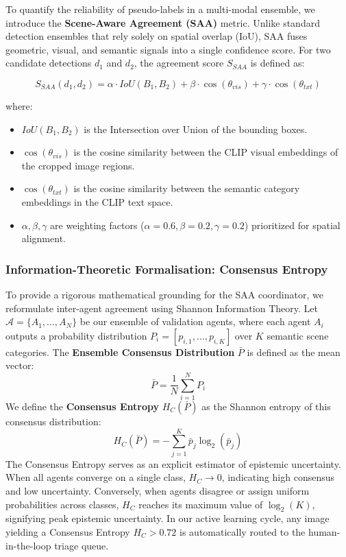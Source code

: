\documentclass[12pt,onecolumn,a4paper]{IEEEtran}
\begin{document}
To quantify the reliability of pseudo-labels in a multi-modal ensemble, we introduce the \textbf{Scene-Aware Agreement (SAA)} metric. Unlike standard detection ensembles that rely solely on spatial overlap (IoU), SAA fuses geometric, visual, and semantic signals into a single confidence score. For two candidate detections $d_1$ and $d_2$, the agreement score $S_{SAA}$ is defined as:

\begin{equation}
S_{SAA}(d_1, d_2) = \alpha \cdot IoU(B_1, B_2) + \beta \cdot \cos(\theta_{vis}) + \gamma \cdot \cos(\theta_{txt})
\end{equation}

where:
\begin{itemize}
    \item $IoU(B_1, B_2)$ is the Intersection over Union of the bounding boxes.
    \item $\cos(\theta_{vis})$ is the cosine similarity between the CLIP \cite{clip2021} visual embeddings of the cropped image regions.
    \item $\cos(\theta_{txt})$ is the cosine similarity between the semantic category embeddings in the CLIP text space.
    \item $\alpha, \beta, \gamma$ are weighting factors ($\alpha=0.6, \beta=0.2, \gamma=0.2$) prioritized for spatial alignment.
\end{itemize}

\subsubsection{Information-Theoretic Formalisation: Consensus Entropy}
To provide a rigorous mathematical grounding for the SAA coordinator, we reformulate inter-agent agreement using Shannon Information Theory. Let $\mathcal{A} = \{A_1, \dots, A_N\}$ be our ensemble of validation agents, where each agent $A_i$ outputs a probability distribution $P_i = [p_{i,1}, \dots, p_{i,K}]$ over $K$ semantic scene categories. The \textbf{Ensemble Consensus Distribution} $\bar{P}$ is defined as the mean vector:
\begin{equation}
  \bar{P} = \frac{1}{N}\sum_{i=1}^N P_i
\end{equation}
We define the \textbf{Consensus Entropy} $H_C(\bar{P})$ as the Shannon entropy of this consensus distribution:
\begin{equation}
  H_C(\bar{P}) = -\sum_{j=1}^K \bar{p}_j \log_2(\bar{p}_j)
\end{equation}
The Consensus Entropy serves as an explicit estimator of epistemic uncertainty. When all agents converge on a single class, $H_C \to 0$, indicating high consensus and low uncertainty. Conversely, when agents disagree or assign uniform probabilities across classes, $H_C$ reaches its maximum value of $\log_2(K)$, signifying peak epistemic uncertainty. In our active learning cycle, any image yielding a Consensus Entropy $H_C > 0.72$ is automatically routed to the human-in-the-loop triage queue.
\end{document}
